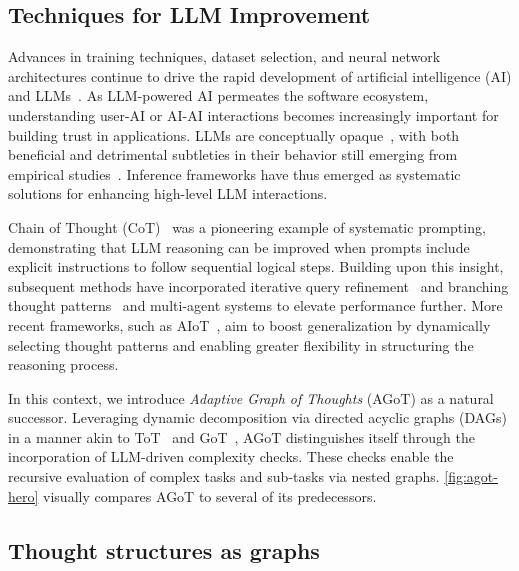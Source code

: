 \documentclass{article}
\begin{document}
\subsection{Techniques for LLM Improvement}

Advances in training techniques, dataset selection, and neural network architectures continue to drive the rapid development of artificial intelligence (AI) and LLMs~\citep{anil2023palm, openai2023gpt4, team2023gemini, dubey2024llama, openai2024o1}. As LLM-powered AI permeates the software ecosystem, understanding user-AI or AI-AI interactions becomes increasingly important for building trust in applications. LLMs are conceptually opaque~\citep{singh2023explainingblackboxtext}, with both beneficial and detrimental subtleties in their behavior still emerging from empirical studies~\citep{ajwani2024llmgeneratedblackboxexplanationsadversarially}. Inference frameworks have thus emerged as systematic solutions for enhancing high-level LLM interactions.

Chain of Thought (CoT)~\citep{wei2022chain} was a pioneering example of systematic prompting, demonstrating that LLM reasoning can be improved when prompts include explicit instructions to follow sequential logical steps. Building upon this insight, subsequent methods have incorporated iterative query refinement~\citep{krishna2024understandingeffectsiterativeprompting, radha2024iterationthoughtleveraginginner} and branching thought patterns~\citep{wang2022self, yao2024tree, besta2024graph} and multi-agent systems \citep{radha2024composite} to elevate performance further. More recent frameworks, such as AIoT~\citep{radha2024iterationthoughtleveraginginner}, aim to boost generalization by dynamically selecting thought patterns and enabling greater flexibility in structuring the reasoning process. 

In this context, we introduce \emph{Adaptive Graph of Thoughts} (AGoT) as a natural successor. Leveraging dynamic decomposition via directed acyclic graphs (DAGs) in a manner akin to ToT~\citep{yao2024tree} and GoT~\citep{besta2024graph}, AGoT distinguishes itself through the incorporation of LLM-driven complexity checks. These checks enable the recursive evaluation of complex tasks and sub-tasks via nested graphs. \cref{fig:agot-hero} visually compares AGoT to several of its predecessors.


\subsection{Thought structures as graphs}
\end{document}
